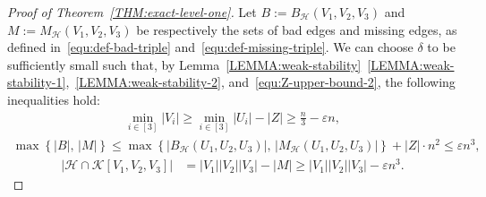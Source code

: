 \documentclass[11pt,a4paper]{article}
\theoremstyle{remark}
\newcommand{\C}[1]{\mathcal{#1}}
\begin{document}
\begin{proof}[Proof of Theorem~\ref{THM:exact-level-one}]
    
    Let $B:=B_{\C H}(V_1,V_2,V_3)$ and $M:=M_{\C H}(V_1,V_2,V_3)$ be respectively the sets of bad edges and missing edges, as defined in~\eqref{equ:def-bad-triple} and~\eqref{equ:def-missing-triple}. 
    We can choose $\delta$ to be sufficiently small such that, by Lemma~\ref{LEMMA:weak-stability}~\ref{LEMMA:weak-stability-1},~\ref{LEMMA:weak-stability-2}, and~\eqref{equ:Z-upper-bound-2}, the following inequalities hold:
    \begin{align}\label{equ:vtx-stab-a}
        \min_{i\in [3]}|V_i| 
         \ge \min_{i\in [3]}|U_i| - |Z|
        \ge \frac{n}{3} - \varepsilon n, 
    \end{align}
    \begin{align}\label{equ:vtx-stab-b}
        \max\left\{|B|,\,|M|\right\} 
         \le \max\left\{|B_{\mathcal{H}}(U_1, U_2, U_3)|,\,|M_{\mathcal{H}}(U_1, U_2, U_3)|\right\} + |Z| \cdot n^2
        \le \varepsilon n^3, 
    \end{align}
    \begin{align}\label{equ:vtx-stab-c}
        |\mathcal{H} \cap \mathcal{K}[V_1, V_2, V_3]| 
        & = |V_1||V_2||V_3| - |M|
        \ge |V_1||V_2||V_3| - \varepsilon n^3. 
    \end{align}

\end{proof}
\end{document}
